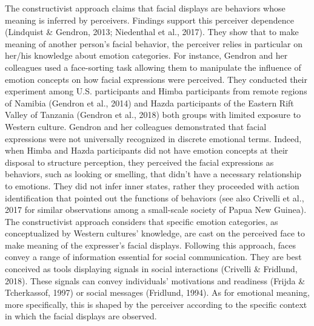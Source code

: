 \documentclass[
  english,
  man]{apa7}
\begin{document}
The constructivist approach claims that facial displays are behaviors whose meaning is inferred by perceivers. Findings support this perceiver dependence (Lindquist \& Gendron, 2013; Niedenthal et al., 2017). They show that to make meaning of another person's facial behavior, the perceiver relies in particular on her/his knowledge about emotion categories. For instance, Gendron and her colleagues used a face-sorting task allowing them to manipulate the influence of emotion concepts on how facial expressions were perceived. They conducted their experiment among U.S. participants and Himba participants from remote regions of Namibia (Gendron et al., 2014) and Hazda participants of the Eastern Rift Valley of Tanzania (Gendron et al., 2018) both groups with limited exposure to Western culture. Gendron and her colleagues demonstrated that facial expressions were not universally recognized in discrete emotional terms. Indeed, when Himba and Hazda participants did not have emotion concepts at their disposal to structure perception, they perceived the facial expressions as behaviors, such as looking or smelling, that didn't have a necessary relationship to emotions. They did not infer inner states, rather they proceeded with action identification that pointed out the functions of behaviors (see also Crivelli et al., 2017 for similar observations among a small-scale society of Papua New Guinea). The constructivist approach considers that specific emotion categories, as conceptualized by Western cultures' knowledge, are cast on the perceived face to make meaning of the expresser's facial displays. Following this approach, faces convey a range of information essential for social communication. They are best conceived as tools displaying signals in social interactions (Crivelli \& Fridlund, 2018). These signals can convey individuals' motivations and readiness (Frijda \& Tcherkassof, 1997) or social messages (Fridlund, 1994). As for emotional meaning, more specifically, this is shaped by the perceiver according to the specific context in which the facial displays are observed.
\end{document}
